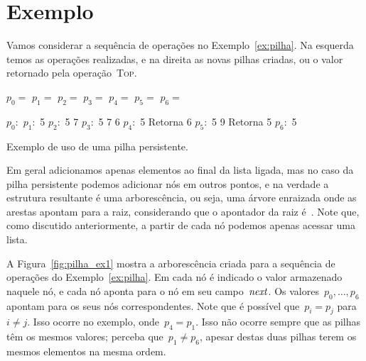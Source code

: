 \documentclass[main.tex]{subfiles}
\begin{document}
\section{Exemplo}

Vamos considerar a sequência de operações no Exemplo~\ref{ex:pilha}. Na esquerda temos as operações realizadas, e na direita as novas pilhas criadas, ou o valor retornado pela operação~\textsc{Top}.

\begin{table}
\centering

\begin{subalgorithm}{0.4\textwidth}
\begin{algorithmic}

\State $p_0 =$ 
\State $p_1 =$ 
\State $p_2 =$ 
\State $p_3 =$ 
\State $p_4 =$ 
\State {}
\State $p_5 =$ 
\State {}
\State $p_6 =$ 

\end{algorithmic}
\end{subalgorithm} \vrule
\begin{subalgorithm}{0.4\textwidth}
\begin{algorithmic}

\State $p_0:$
\State $p_1:$ 5
\State $p_2:$ 5 7
\State $p_3:$ 5 7 6
\State $p_4:$ 5
\State Retorna 6
\State $p_5:$ 5 9
\State Retorna 5
\State $p_6:$ 5

\end{algorithmic}
\end{subalgorithm}
\caption{Exemplo de uso de uma pilha persistente.} \label{ex:pilha}
\end{table}

Em geral adicionamos apenas elementos ao final da lista ligada, mas no caso da pilha persistente podemos adicionar nós em outros pontos, e na verdade a estrutura resultante é uma arborescência, ou seja, uma árvore enraizada onde as arestas apontam para a raiz, considerando que o apontador da raiz é~. Note que, como discutido anteriormente, a partir de cada nó podemos apenas acessar uma lista.

A Figura~\ref{fig:pilha_ex1} mostra a arborescência criada para a sequência de operações do Exemplo~\ref{ex:pilha}. Em cada nó é indicado o valor armazenado naquele nó, e cada nó aponta para o nó em seu campo~$\mathit{next}$. Os valores~$p_0, \ldots, p_6$ apontam para os seus nós correspondentes. Note que é possível que~${p_i = p_j}$ para~${i \neq j}$. Isso ocorre no exemplo, onde~$p_4 = p_1$. Isso não ocorre sempre que as pilhas têm os mesmos valores; perceba que~$p_1 \neq p_6$, apesar destas duas pilhas terem os mesmos elementos na mesma ordem.
\end{document}
